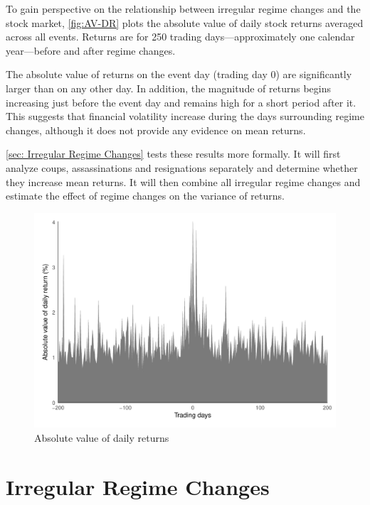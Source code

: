 \documentclass[12pt,final,fleqn]{article}
\theoremstyle{plain}
\begin{document}
To gain perspective on the relationship between irregular regime changes and the stock market, \autoref{fig:AV-DR} plots the absolute value of daily stock returns averaged across all events. Returns are for 250 trading days---approximately one calendar year---before and after regime changes.

The absolute value of returns on the event day (trading day 0) are significantly larger than on any other day. In addition, the magnitude of returns begins increasing just before the event day and remains high for a short period after it. This suggests that financial volatility increase during the days surrounding regime changes, although it does not provide any evidence on mean returns.

\autoref{sec: Irregular Regime Changes} tests these results more formally. It will first analyze coups, assassinations and resignations separately and determine whether they increase mean returns. It will then combine all irregular regime changes and estimate the effect of regime changes on the variance of returns.

\begin{figure}[!ht]
\includegraphics{../figs/daily_mean_absreturn.pdf}
\caption{Absolute value of daily returns}
\label{fig:AV-DR}
\end{figure}


\section{Irregular Regime Changes} \label{sec: Irregular Regime Changes}
\end{document}
